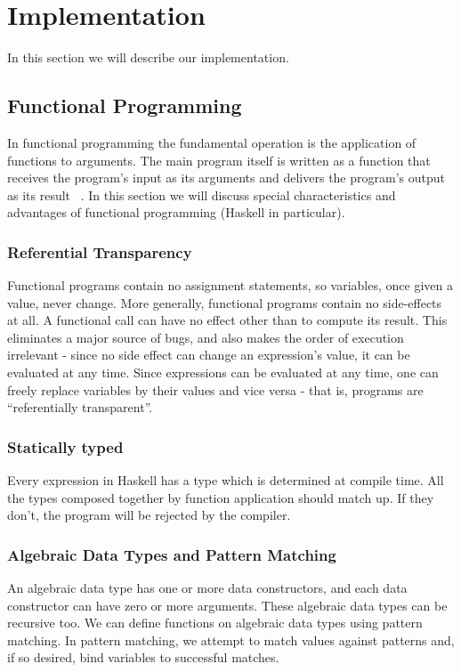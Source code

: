 \chapter{Implementation}
\label{chap:implementation}

In this section we will describe our implementation.

\section{Functional Programming}
In functional programming the fundamental operation is the application of
functions to arguments. The main program itself is written as a function that
receives the program's input as its arguments and delivers the program's output as its result ~\cite{hughes1989functional}.
In this section we will discuss special characteristics and advantages of functional programming (Haskell in particular).

\subsection{Referential Transparency}
Functional programs contain no assignment statements, so variables, once given a value, never change. More generally, functional programs contain no side-effects at all. A functional call can have no effect other than to compute its result.
This eliminates a major source of bugs, and also makes the order of execution irrelevant - since no side effect can change an expression's value, it can be evaluated at any time. Since expressions can be evaluated at any time, one can freely replace variables by their values and vice versa - that is, programs are ``referentially transparent''.

\subsection{Statically typed}
Every expression in Haskell has a type which is determined at compile time. All the types composed together by function application should match up. If they don't, the program will be rejected by the compiler.

\subsection{Algebraic Data Types and Pattern Matching}
An algebraic data type has one or more data constructors, and each data constructor can have zero or more arguments. These algebraic data types can be recursive too.
We can define functions on algebraic data types using pattern matching. In pattern matching, we attempt to match values against patterns and, if so desired, bind variables to successful matches.

